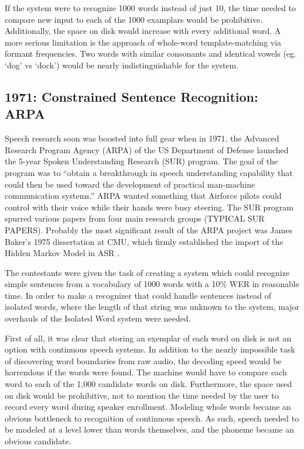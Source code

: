 \documentclass[10pt,a4paper]{article}
\begin{document}
If the system were to recognize 1000 words instead of just 10, the time needed to compare new input to each of the 1000 examplars would be prohibitive. Additionally, the space on disk would increase with every additional word. A more serious limitation is the approach of whole-word template-matching via formant frequencies. Two words with similar consonants and identical vowels (eg. `dog' vs `dock') would be nearly indistinguishable for the system.

\subsection{1971: Constrained Sentence Recognition: ARPA}

 Speech research soon was boosted into full gear when in 1971, the Advanced Research Program Agency (ARPA) of the US Department of Defense launched the 5-year Spoken Understanding Research (SUR) program. The goal of the program was to ``obtain a breakthrough in speech understanding capability that could then be used toward the development of practical man-machine communication systems.'' \cite{klatt1977} ARPA wanted something that Airforce pilots could control with their voice while their hands were busy steering. The SUR program spurred various papers from four main research groups (TYPICAL SUR PAPERS). Probably the most significant result of the ARPA project was James Baker's 1975 dissertation at CMU, which firmly established the import of the Hidden Markov Model in ASR \cite{bakerDissertation1975}.


 The contestants were given the task of creating a system which could recognize simple sentences from a vocabulary of 1000 words with a 10\% WER in reasonable time. In order to make a recognizer that could handle sentences instead of isolated words, where the length of that string was unknown to the system, major overhauls of the Isolated Word system were needed.

First of all, it was clear that storing an exemplar of each word on disk is not an option with continuous speech systems. In addition to the nearly impossible task of discovering word boundaries from raw audio, the decoding speed would be horrendous if the words were found. The machine would have to compare each word to each of the 1,000 candidate words on disk. Furthermore, the space used on disk would be prohibitive, not to mention the time needed by the user to record every word during speaker enrollment. Modeling whole words became an obvious bottleneck to recognition of continuous speech. As such, speech needed to be modeled at a level lower than words themselves, and the phoneme became an obvious candidate.
\end{document}
